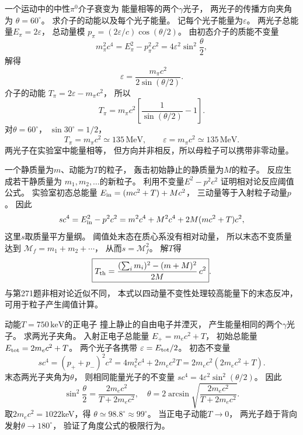 一个运动中的中性$\pi^0$介子衰变为
能量相等的两个$\gamma$光子，
两光子的传播方向夹角为
$\theta=60^\circ$。
求介子的动能以及每个光子能量。
\exsolution
记每个光子能量为$\varepsilon$。
两光子总能量$E_\pi=2\varepsilon$，
总动量模
$p_\pi=(2\varepsilon/c)\cos(\theta/2)$。
由初态介子的质能不变量
\[
 m_\pi^2c^4=E_\pi^2-p_\pi^2c^2
 =4\varepsilon^2\sin^2\frac{\theta}{2},
\]
解得
\[
 \boxed{\varepsilon=
 \frac{m_\pi c^2}{2\sin(\theta/2)}}.
\]
介子的动能
$T_\pi=2\varepsilon-m_\pi c^2$，
所以
\[
 \boxed{T_\pi=m_\pi c^2
 \left[\frac1{\sin(\theta/2)}-1\right]}.
\]
对$\theta=60^\circ$，
$\sin30^\circ=1/2$，
\[
 \boxed{T_\pi=m_\pi c^2\simeq135\,\mathrm{MeV}},\qquad
 \boxed{\varepsilon=m_\pi c^2\simeq135\,\mathrm{MeV}}.
\]
\excheck 两光子在实验室中能量相等，
但方向并非相反，所以母粒子可以携带非零动量。

一个静质量为$m$、动能为$T$的粒子，
轰击初始静止的静质量为$M$的粒子。
反应生成若干静质量为
$m_1,m_2,\ldots$的新粒子。
利用不变量$E^2-p^2c^2$
证明相对论反应阈值公式。
\exsolution
实验室初态总能量
$E_{\rm in}=(mc^2+T)+Mc^2$，
三动量等于入射粒子动量$p$。
因此
\[
 s c^4=E_{\rm in}^2-p^2c^2
 =m^2c^4+M^2c^4+2M(mc^2+T)c^2,
\]
这里$s$取质量平方量纲。
阈值处末态在质心系没有相对动量，
所以末态不变质量达到
$\mathcal M_f=m_1+m_2+\cdots$，
从而$s=\mathcal M_f^2$。
解$T$得
\[
 \boxed{T_{\rm th}=
 \frac{(\sum_i m_i)^2-(m+M)^2}
 {2M}\,c^2}.
\]
\excheck 与第271题非相对论近似不同，
本式以四动量不变性处理较高能量下的末态反冲，
可用于粒子产生阈值计算。

动能$T=750\,\mathrm{keV}$的正电子
撞上静止的自由电子并湮灭，
产生能量相同的两个$\gamma$光子。
求两光子夹角。
\exsolution
入射正电子总能量
$E_+=m_ec^2+T$，
初始总能量$E_{\rm tot}=2m_ec^2+T$。
两个光子各携带
$\varepsilon=E_{\rm tot}/2$。
初态不变量
\[
 s c^4=(p_++p_-)^2c^2
 =4m_e^2c^4+2m_ec^2T
 =2m_ec^2(2m_ec^2+T).
\]
末态两光子夹角为$\theta$，
则相同能量光子的不变量
$s c^4=4\varepsilon^2\sin^2(\theta/2)$。
因此
\[
 \boxed{\sin^2\frac\theta2=
 \frac{2m_ec^2}{T+2m_ec^2}},\quad
 \boxed{\theta=
 2\arcsin\sqrt{\frac{2m_ec^2}{T+2m_ec^2}}}.
\]
取$2m_ec^2=1022$keV，得
$\boxed{\theta\simeq98.8^\circ\approx99^\circ}$。
\excheck 当正电子动能$T\to0$，
两光子趋于背向发射$\theta\to180^\circ$，
验证了角度公式的极限行为。

